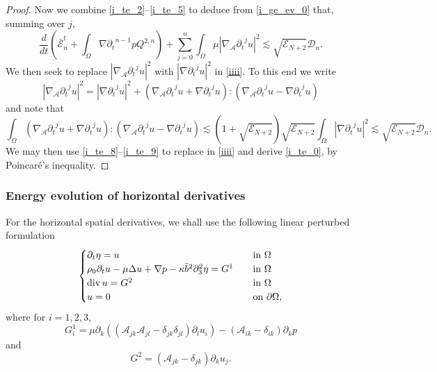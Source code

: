 \documentclass[a4paper,reqno,11pt]{amsart}
\numberwithin{equation}{section}
\providecommand{\abs}[1]{\left\vert#1\right\vert}
\providecommand{\sd}[1]{\mathcal{D}_{#1}}
\providecommand{\se}[1]{\mathcal{E}_{#1}}
\begin{document}
\begin{proof}
Now we combine \eqref{i_te_2}--\eqref{i_te_5} to deduce from \eqref{i_ge_ev_0} that, summing over $j$,
\begin{equation} \label{iiii}
  \frac{d}{dt}\left(\bar{\mathcal{E}}_{n}^{t}+\int_\Omega  \nabla {\partial_t}^{n-1} p  Q^{2,n}\right)
+  \sum_{j=0}^{ n}  \int_\Omega \mu  \abs{ {{\nabla}_{\mathcal{A}}} {\partial_t}^j u}^2
  {\lesssim}   \sqrt{\se{N+2} } \sd{ n}.
\end{equation}
We then seek to replace $ \abs{ \nabla_{\mathcal{A}} {\partial_t}^{j} u}^2$ with $\abs{\nabla {\partial_t}^{j} u}^2$
in \eqref{iiii}.  To this end we write
\begin{equation}\label{i_te_8}
 \abs{ {{\nabla}_{\mathcal{A}}} {\partial_t}^{j} u}^2 = \abs{\nabla {\partial_t}^{j} u}^2 +   \left({{\nabla}_{\mathcal{A}}} {\partial_t}^{j} u + \nabla{\partial_t}^{j} u\right): \left({{\nabla}_{\mathcal{A}}} {\partial_t}^{j} u - \nabla {\partial_t}^{j} u\right)
\end{equation}
and note that
\begin{equation}\label{i_te_9}
 \int_\Omega \left({{\nabla}_{\mathcal{A}}} {\partial_t}^{j} u + \nabla{\partial_t}^{j} u\right): \left({{\nabla}_{\mathcal{A}}} {\partial_t}^{j} u - \nabla {\partial_t}^{j} u\right)
{\lesssim}  (1 + \sqrt{\se{N+2}})\sqrt{\se{N+2}} \int_\Omega \abs{{\nabla} {\partial_t}^{j} u}^2  {\lesssim}  \sqrt{\se{N+2}} \sd{n}.
\end{equation}
We may then use \eqref{i_te_8}--\eqref{i_te_9} to replace in \eqref{iiii} and derive \eqref{i_te_0}, by Poincar\'e's inequality.
\end{proof}

\subsubsection{Energy evolution of horizontal derivatives}

For the horizontal spatial derivatives, we shall use the following linear perturbed formulation
\begin{equation}\label{perturb}
\begin{cases}
 {\partial_t}\eta=u&\hbox{in }\Omega
\\\rho_0\partial_t u-\mu\Delta u+\nabla p- \kappa\bar b^2 {\partial}_3^2\eta=G^1\quad&\hbox{in }\Omega
\\ \operatorname{div} u=G^2&\hbox{in }\Omega
\\ u  =0 &\hbox{on }{\partial}\Omega,
\end{cases}
\end{equation}
where for $i=1,2,3$,
\begin{equation}\label{G1_def}
 G^1_i=   \mu{\partial}_k(({\mathcal{A}}_{jk}{\mathcal{A}}_{jl}-\delta_{jk}\delta_{jl}){\partial}_l u_i)-({\mathcal{A}}_{ik}-\delta_{ik}){\partial}_kp
 \end{equation}
 and
\begin{equation}
G^2=({\mathcal{A}}_{jk}-\delta_{jk}){\partial}_k u_j.\label{G2}
 \end{equation}
\end{document}
